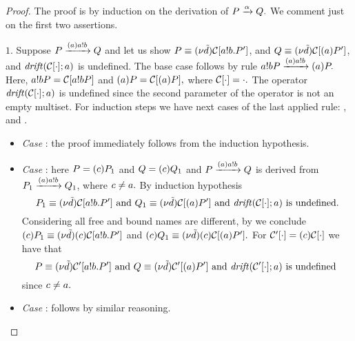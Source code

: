 \begin{proof}
The proof is by induction on the derivation of $P\xrightarrow{\alpha}Q.$ We comment just on the first two assertions.

$\mathit{1.}$ Suppose $P\xrightarrow{{(a)}a!b}Q$ and let us show $P\equiv(\nu \tilde {d})\mathcal{C}[a!b.P']$, and $Q\equiv(\nu \tilde {d})\mathcal{C}[(a)P']$, and $\mathit {drift}(\mathcal{C}[\cdot]; a)$ is undefined.
 The base case follows by rule  $a!bP\xrightarrow{{(a)}a!b}(a)P.$ Here, $a!bP=\mathcal{C}[a!bP]$ and $(a)P=\mathcal{C}[(a)P],$ where $\mathcal{C}[\cdot]=\cdot.$ The operator $\mathit {drift}(\mathcal{C}[\cdot]; a)$ is undefined since the second parameter of the operator is not an empty multiset. %
For induction steps we have next cases of the last applied rule: ,  and . 
\begin{itemize}
\item \emph{Case} : the proof immediately follows from the induction hypothesis.
% 
\item \emph{Case} : here $P=(c)P_1$ and $Q=(c)Q_1$ and $P\xrightarrow{{(a)}a!b}Q$ is derived from $P_1\xrightarrow{{(a)}a!b}Q_1$, where $c\not=a.$ By induction hypothesis 
\[
P_1\equiv(\nu \tilde {d})\mathcal{C}[a!b.P'] \text{ and } Q_1\equiv(\nu \tilde {d})\mathcal{C}[(a)P'] \text{ and } \mathit {drift}(\mathcal{C}[\cdot]; a) \text{ is undefined.}
\] 
Considering all free and bound names are different, by  we conclude $(c)P_1\equiv(\nu \tilde {d})(c)\mathcal{C}[a!b.P']$ and $(c)Q_1\equiv(\nu \tilde {d})(c)\mathcal{C}[(a)P'].$ For $\mathcal{C}'[\cdot]=(c)\mathcal{C}[\cdot]$ we have that  
\[
P\equiv(\nu \tilde {d})\mathcal{C}'[a!b.P'] \text{ and } Q\equiv(\nu \tilde {d})\mathcal{C}'[(a)P'] \text{ and } \mathit {drift}(\mathcal{C}'[\cdot]; a) \text{ is undefined }
\] 
since $c\not=a.$
\item  \emph{Case} : follows by similar reasoning.
\end{itemize}





\end{proof}

